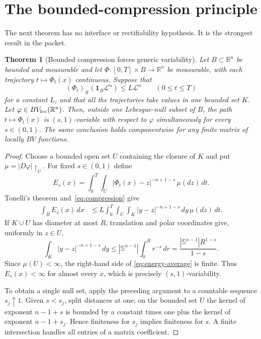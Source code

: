 \documentclass[11pt]{article}
\newtheorem{theorem}{Theorem}
\newcommand{\R}{\mathbb{R}}
\begin{document}
\section{The bounded-compression principle}

The next theorem has no interface or rectifiability hypothesis.  It is the
strongest result in the packet.

\begin{theorem}[Bounded compression forces generic variability]
\label{thm:compression}
Let $B\subset\R^n$ be bounded and measurable and let
$\Phi:[0,T]\times B\to\R^n$ be measurable, with each trajectory
$t\mapsto\Phi_t(x)$ continuous.  Suppose that
\begin{equation}\label{eq:compression}
 (\Phi_t)_\#(\mathbf1_B\mathcal L^n)\leq L\mathcal L^n
 \qquad(0\leq t\leq T)
\end{equation}
for a constant $L$, and that all the trajectories take values in one bounded
set $K$.  Let $\varphi\in BV_{\rm loc}(\R^n)$.  Then, outside one
Lebesgue-null subset of $B$, the path $t\mapsto\Phi_t(x)$ is
$(s,1)$-variable with respect to $\varphi$ simultaneously for every
$s\in(0,1)$.  The same conclusion holds componentwise for any finite matrix
of locally $BV$ functions.
\end{theorem}

\begin{proof}
Choose a bounded open set $U$ containing the closure of $K$ and put
$\mu=|D\varphi|\restriction_U$.  For fixed $s\in(0,1)$ define
\[
 E_s(x)=\int_0^T\int_U
 |\Phi_t(x)-z|^{-n+1-s}\,\mu(dz)\,dt.
\]
Tonelli's theorem and~\eqref{eq:compression} give
\begin{align}
 \int_B E_s(x)\,dx
 &\leq L\int_0^T\int_U\int_K
 |y-z|^{-n+1-s}\,dy\,\mu(dz)\,dt.\label{eq:energy-average}
\end{align}
If $K\cup U$ has diameter at most $R$, translation and polar coordinates
give, uniformly in $z\in U$,
\[
 \int_K|y-z|^{-n+1-s}\,dy
 \leq |\mathbb S^{n-1}|\int_0^R r^{-s}\,dr
 =\frac{|\mathbb S^{n-1}|R^{1-s}}{1-s}.
\]
Since $\mu(U)<\infty$, the right-hand side of
\eqref{eq:energy-average} is finite.  Thus $E_s(x)<\infty$ for almost every
$x$, which is precisely $(s,1)$-variability.

To obtain a single null set, apply the preceding argument to a countable
sequence $s_j\uparrow1$.  Given $s<s_j$, split distances at one; on the
bounded set $U$ the kernel of exponent $n-1+s$ is bounded by a constant times
one plus the kernel of exponent $n-1+s_j$.  Hence finiteness for $s_j$
implies finiteness for $s$.  A finite intersection handles all entries of a
matrix coefficient.
\end{proof}
\end{document}
